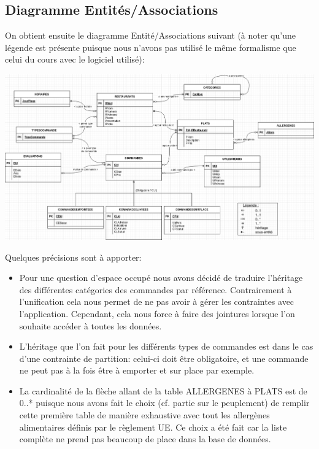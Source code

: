 \documentclass[10pt, a4paper]{article}
\begin{document}
\begin{landscape}
    \subsection{Diagramme Entités/Associations}
    On obtient ensuite le diagramme Entité/Associations suivant (à noter qu'une légende est présente puisque nous n'avons pas utilisé le même formalisme que celui du cours avec le logiciel utilisé):
    \begin{center}
        \includegraphics[scale=0.45]{Diagramme_entite_relation.png}\\
    \end{center}

\end{landscape}

Quelques précisions sont à apporter:

\begin{itemize}
    \item Pour une question d'espace occupé nous avons décidé de traduire l'héritage des différentes catégories des commandes par référence. Contrairement à l'unification cela nous permet de ne pas avoir à gérer les contraintes avec l'application. Cependant, cela nous force à faire des jointures lorsque l'on souhaite accéder à toutes les données.
    \item L'héritage que l'on fait pour les différents types de commandes est dans le cas d'une contrainte de partition: celui-ci doit être obligatoire, et une commande ne peut pas à la fois être à emporter et sur place par exemple.
    \item La cardinalité de la flèche allant de la table ALLERGENES à PLATS est de 0..* puisque nous avons fait le choix (cf. partie sur le peuplement) de remplir cette première table de manière exhaustive avec tout les allergènes alimentaires définis par le règlement UE. Ce choix a été fait car la liste complète ne prend pas beaucoup de place dans la base de données.

\end{itemize}
\end{document}
